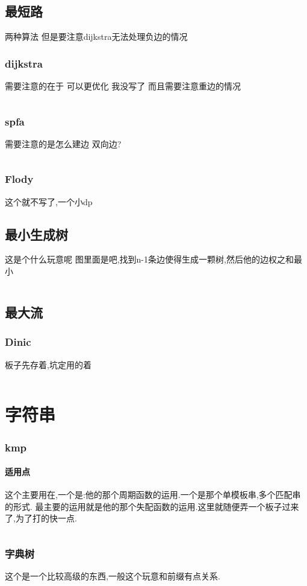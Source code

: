 \documentclass[a4paper,11pt]{article}
\begin{document}
\begin{CJK}{UTF8}{gbsn}
\subsection{最短路}
两种算法 但是要注意dijkstra无法处理负边的情况
\subsubsection{dijkstra}
需要注意的在于 可以更优化 我没写了 而且需要注意重边的情况
\inputminted{c++}{../scoure/Graph_theory/dijkstra.cpp}
\subsubsection{spfa}
需要注意的是怎么建边 双向边?
\inputminted{c++}{../scoure/Graph_theory/spfa.cpp}
\subsubsection{Flody}
这个就不写了,一个小dp
\subsection{最小生成树}
这是个什么玩意呢 图里面是吧,找到n-1条边使得生成一颗树,然后他的边权之和最小
\inputminted{c++}{../scoure/Graph_theory/prime.cpp}
\subsection{最大流}
\subsubsection{Dinic}
板子先存着,坑定用的着
\inputminted{c++}{../scoure/Graph_theory/dinic.cpp}
\newpage
\section{字符串}
\subsubsection{kmp}
\paragraph{适用点}
这个主要用在,一个是:他的那个周期函数的运用.一个是那个单模板串,多个匹配串的形式.
最主要的运用就是他的那个失配函数的运用.这里就随便弄一个板子过来了,为了打的快一点.
\inputminted{c++}{../scoure/date/kmp.cpp}
\subsubsection{字典树}
这个是一个比较高级的东西,一般这个玩意和前缀有点关系.
\inputminted{c++}{../scoure/date/Trie.cpp}

\end{CJK}
\end{document}
